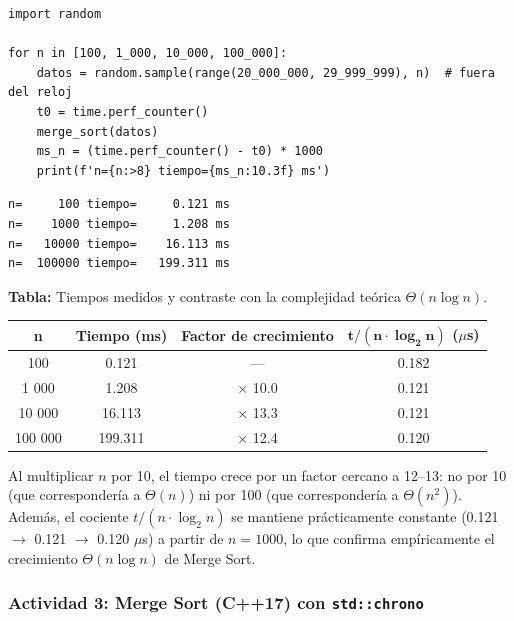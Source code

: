 \documentclass[12pt,a4paper]{article}
\begin{document}
\begin{lstlisting}[style=python,caption={Benchmark para los cuatro tamaños solicitados.}]
import random

for n in [100, 1_000, 10_000, 100_000]:
    datos = random.sample(range(20_000_000, 29_999_999), n)  # fuera del reloj
    t0 = time.perf_counter()
    merge_sort(datos)
    ms_n = (time.perf_counter() - t0) * 1000
    print(f'n={n:>8} tiempo={ms_n:10.3f} ms')
\end{lstlisting}

\begin{lstlisting}[style=consola,caption={Salida de consola.}]
n=     100 tiempo=     0.121 ms
n=    1000 tiempo=     1.208 ms
n=   10000 tiempo=    16.113 ms
n=  100000 tiempo=   199.311 ms
\end{lstlisting}

\begin{center}
\textbf{Tabla:} Tiempos medidos y contraste con la complejidad teórica $\Theta(n \log n)$.

\vspace{4pt}
\begin{tabular}{|c|c|c|c|}
\hline
\textbf{n} & \textbf{Tiempo (ms)} & \textbf{Factor de crecimiento} & $\mathbf{t / (n \cdot \log_2 n)}$ \textbf{($\mu$s)} \\
\hline
100 & 0.121 & --- & 0.182 \\
\hline
1 000 & 1.208 & $\times$ 10.0 & 0.121 \\
\hline
10 000 & 16.113 & $\times$ 13.3 & 0.121 \\
\hline
100 000 & 199.311 & $\times$ 12.4 & 0.120 \\
\hline
\end{tabular}
\end{center}

\vspace{6pt}
Al multiplicar $n$ por 10, el tiempo crece por un factor cercano a 12--13: no por 10
(que correspondería a $\Theta(n)$) ni por 100 (que correspondería a $\Theta(n^2)$).
Además, el cociente $t/(n \cdot \log_2 n)$ se mantiene prácticamente constante
(0.121 $\rightarrow$ 0.121 $\rightarrow$ 0.120 $\mu$s) a partir de $n = 1000$, lo que
confirma empíricamente el crecimiento $\Theta(n \log n)$ de Merge Sort.

\subsubsection*{Actividad 3: Merge Sort (C++17) con \texttt{std::chrono}}
\end{document}
